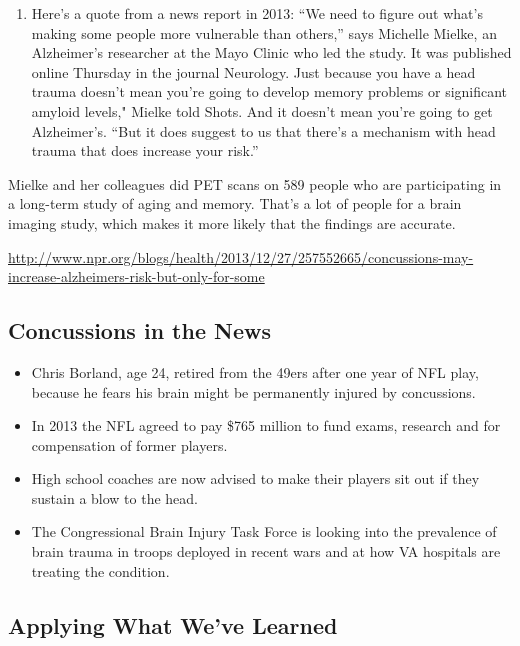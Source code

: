 \documentclass[
]{report}
\providecommand{\tightlist}{%
  \setlength{\itemsep}{0pt}\setlength{\parskip}{0pt}}
\begin{document}
\begin{enumerate}
\def\labelenumi{\arabic{enumi}.}
\setcounter{enumi}{2}
\tightlist
\item
  Here's a quote from a news report in 2013:
  ``We need to figure out what's making some people more vulnerable than others,'' says Michelle Mielke, an Alzheimer's researcher at the Mayo Clinic who led the study. It was published online Thursday in the journal Neurology. Just because you have a head trauma doesn't mean you're going to develop memory problems or significant amyloid levels," Mielke told Shots. And it doesn't
  mean you're going to get Alzheimer's. ``But it does suggest to us that there's a mechanism with head trauma that does increase your risk.''
\end{enumerate}

Mielke and her colleagues did PET scans on 589 people who are participating in a long-term study of aging and memory. That's a lot of people for a brain imaging study, which makes it more likely that the findings are accurate.

\url{http://www.npr.org/blogs/health/2013/12/27/257552665/concussions-may-increase-alzheimers-risk-but-only-for-some}

\hypertarget{concussions-in-the-news}{%
\subsection{Concussions in the News}\label{concussions-in-the-news}}

\begin{itemize}
\item
  Chris Borland, age 24, retired from the 49ers after one year of NFL play, because he fears his brain might be permanently injured by concussions.
\item
  In 2013 the NFL agreed to pay \$765 million to fund exams, research and for compensation of former players.
\item
  High school coaches are now advised to make their players sit out if they sustain
  a blow to the head.
\item
  The Congressional Brain Injury Task Force is looking into the prevalence of brain trauma in troops deployed in recent wars and at how VA hospitals are treating the condition.
\end{itemize}

\hypertarget{applying-what-weve-learned}{%
\subsection{Applying What We've Learned}\label{applying-what-weve-learned}}
\end{document}
